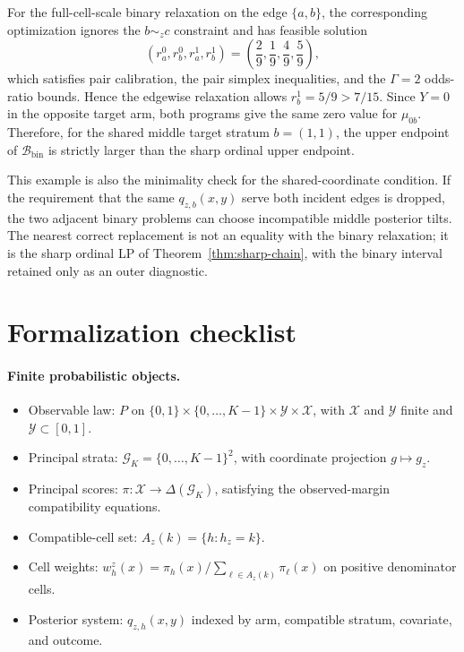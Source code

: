 \documentclass[11pt]{article}
\theoremstyle{definition}
\theoremstyle{plain}
\theoremstyle{remark}
\begin{document}
For the full-cell-scale binary relaxation on the edge \(\{a,b\}\), the
corresponding optimization ignores the \(b\sim_z c\) constraint and has feasible
solution
\[
  (r_a^0,r_b^0,r_a^1,r_b^1)
  =
  \left(\frac29,\frac19,\frac49,\frac59\right),
\]
which satisfies pair calibration, the pair simplex inequalities, and the
\(\Gamma=2\) odds-ratio bounds.  Hence the edgewise relaxation allows
\(r_b^1=5/9>7/15\).  Since \(Y=0\) in the opposite target arm, both programs
give the same zero value for \(\mu_{0b}\).  Therefore, for the shared middle
target stratum \(b=(1,1)\), the upper endpoint of
\(\mathcal B_{\mathrm{bin}}\) is strictly larger than the sharp ordinal upper
endpoint.

This example is also the minimality check for the shared-coordinate condition.
If the requirement that the same \(q_{z,b}(x,y)\) serve both incident edges is
dropped, the two adjacent binary problems can choose incompatible middle
posterior tilts.  The nearest correct replacement is not an equality with the
binary relaxation; it is the sharp ordinal LP of Theorem~\ref{thm:sharp-chain},
with the binary interval retained only as an outer diagnostic.

\section{Formalization checklist}
\paragraph{Finite probabilistic objects.}
\begin{itemize}
  \item Observable law:
  \(P\) on
  \(\{0,1\}\times\{0,\ldots,K-1\}\times\mathcal Y\times\mathcal X\),
  with \(\mathcal X\) and \(\mathcal Y\) finite and \(\mathcal Y\subset[0,1]\).
  \item Principal strata:
  \(\mathcal G_K=\{0,\ldots,K-1\}^2\), with coordinate projection
  \(g\mapsto g_z\).
  \item Principal scores:
  \(\pi:\mathcal X\to\Delta(\mathcal G_K)\), satisfying the observed-margin
  compatibility equations.
  \item Compatible-cell set:
  \(A_z(k)=\{h:h_z=k\}\).
  \item Cell weights:
  \(w^z_h(x)=\pi_h(x)/\sum_{\ell\in A_z(k)}\pi_\ell(x)\) on positive
  denominator cells.
  \item Posterior system:
  \(q_{z,h}(x,y)\) indexed by arm, compatible stratum, covariate, and outcome.
\end{itemize}
\end{document}

